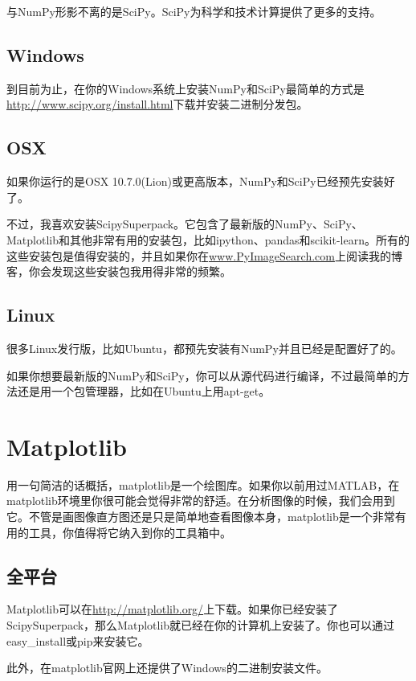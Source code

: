 \documentclass[color=green,mathpazo,titlestyle=hang]{elegantbook}
\begin{document}
与NumPy形影不离的是SciPy。SciPy为科学和技术计算提供了更多的支持。

\subsection{Windows}

到目前为止，在你的Windows系统上安装NumPy和SciPy最简单的方式是\url{http://www.scipy.org/install.html}下载并安装二进制分发包。

\subsection{OSX}

如果你运行的是OSX 10.7.0(Lion)或更高版本，NumPy和SciPy已经预先安装好了。

不过，我喜欢安装ScipySuperpack。它包含了最新版的NumPy、SciPy、Matplotlib和其他非常有用的安装包，比如ipython、pandas和scikit-learn。所有的这些安装包是值得安装的，并且如果你在\url{www.PyImageSearch.com}上阅读我的博客，你会发现这些安装包我用得非常的频繁。

\subsection{Linux}

很多Linux发行版，比如Ubuntu，都预先安装有NumPy并且已经是配置好了的。

如果你想要最新版的NumPy和SciPy，你可以从源代码进行编译，不过最简单的方法还是用一个包管理器，比如在Ubuntu上用apt-get。

\section{Matplotlib}

用一句简洁的话概括，matplotlib是一个绘图库。如果你以前用过MATLAB，在matplotlib环境里你很可能会觉得非常的舒适。在分析图像的时候，我们会用到它。不管是画图像直方图还是只是简单地查看图像本身，matplotlib是一个非常有用的工具，你值得将它纳入到你的工具箱中。

\subsection{全平台}

Matplotlib可以在\url{http://matplotlib.org/}上下载。如果你已经安装了ScipySuperpack，那么Matplotlib就已经在你的计算机上安装了。你也可以通过easy\_install或pip来安装它。

此外，在matplotlib官网上还提供了Windows的二进制安装文件。
\end{document}

